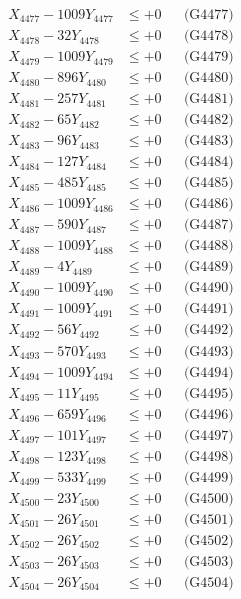 \documentclass[a4paper,10pt]{article}
\begin{document}
{\begin{align}
X_{4477} - 1009Y_{4477} &\leq +0 && \text{(G4477)} \\
X_{4478} - 32Y_{4478} &\leq +0 && \text{(G4478)} \\
X_{4479} - 1009Y_{4479} &\leq +0 && \text{(G4479)} \\
X_{4480} - 896Y_{4480} &\leq +0 && \text{(G4480)} \\
\allowbreak
X_{4481} - 257Y_{4481} &\leq +0 && \text{(G4481)} \\
X_{4482} - 65Y_{4482} &\leq +0 && \text{(G4482)} \\
X_{4483} - 96Y_{4483} &\leq +0 && \text{(G4483)} \\
X_{4484} - 127Y_{4484} &\leq +0 && \text{(G4484)} \\
X_{4485} - 485Y_{4485} &\leq +0 && \text{(G4485)} \\
X_{4486} - 1009Y_{4486} &\leq +0 && \text{(G4486)} \\
X_{4487} - 590Y_{4487} &\leq +0 && \text{(G4487)} \\
X_{4488} - 1009Y_{4488} &\leq +0 && \text{(G4488)} \\
X_{4489} - 4Y_{4489} &\leq +0 && \text{(G4489)} \\
X_{4490} - 1009Y_{4490} &\leq +0 && \text{(G4490)} \\
\allowbreak
X_{4491} - 1009Y_{4491} &\leq +0 && \text{(G4491)} \\
X_{4492} - 56Y_{4492} &\leq +0 && \text{(G4492)} \\
X_{4493} - 570Y_{4493} &\leq +0 && \text{(G4493)} \\
X_{4494} - 1009Y_{4494} &\leq +0 && \text{(G4494)} \\
X_{4495} - 11Y_{4495} &\leq +0 && \text{(G4495)} \\
X_{4496} - 659Y_{4496} &\leq +0 && \text{(G4496)} \\
X_{4497} - 101Y_{4497} &\leq +0 && \text{(G4497)} \\
X_{4498} - 123Y_{4498} &\leq +0 && \text{(G4498)} \\
X_{4499} - 533Y_{4499} &\leq +0 && \text{(G4499)} \\
X_{4500} - 23Y_{4500} &\leq +0 && \text{(G4500)} \\
\allowbreak
X_{4501} - 26Y_{4501} &\leq +0 && \text{(G4501)} \\
X_{4502} - 26Y_{4502} &\leq +0 && \text{(G4502)} \\
X_{4503} - 26Y_{4503} &\leq +0 && \text{(G4503)} \\
X_{4504} - 26Y_{4504} &\leq +0 && \text{(G4504)} \\

\end{align}}
\end{document}
